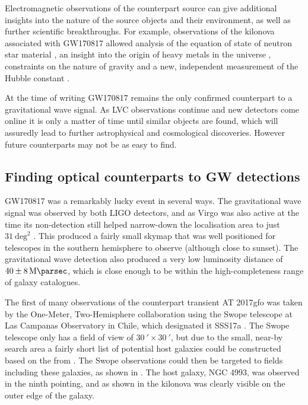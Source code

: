 \begin{colsection}
\begin{colsection}
Electromagnetic observations of the counterpart source can give additional insights into the nature of the source objects and their environment, as well as further scientific breakthroughs. For example, observations of the kilonova associated with GW170817 \citep{GW170817, GW170817_followup} allowed analysis of the equation of state of neutron star material \citep{GW170817_NSscience}, an insight into the origin of heavy metals in the universe \citep{GW170818_heavy}, constraints on the nature of gravity \citep{GW170817_gravity} and a new, independent measurement of the Hubble constant \citep{GW170817_hubble}.

\newpage

At the time of writing GW170817 remains the only confirmed counterpart to a gravitational wave signal. As LVC observations continue and new detectors come online it is only a matter of time until similar objects are found, which will assuredly lead to further astrophysical and cosmological discoveries. However future counterparts may not be as easy to find.

\end{colsection}


\subsection{Finding optical counterparts to GW detections}
\label{sec:followup}
\begin{colsection}

GW170817 was a remarkably lucky event in several ways. The gravitational wave signal was observed by both LIGO detectors, and as Virgo was also active at the time its non-detection still helped narrow-down the localisation area to just $31~\text{deg}^2$ \citep[see ]{GW170817}. This produced a fairly small skymap that was well positioned for telescopes in the southern hemisphere to observe (although close to sunset). The gravitational wave detection also produced a very low luminosity distance of $40\pm\SI{8}{\mega\parsec}$, which is close enough to be within the high-completeness range of galaxy catalogues.

The first of many observations of the counterpart transient AT 2017gfo was taken by the One-Meter, Two-Hemisphere collaboration using the Swope telescope at Las Campanas Observatory in Chile, which designated it SSS17a \citep{GW170817_Swope}. The Swope telescope only has a field of view of $\SI{30}{\arcmin}\times\SI{30}{\arcmin}$, but due to the small, near-by search area a fairly short list of potential host galaxies could be constructed based on the  from \citet{GWGC}. The Swope observations could then be targeted to fields including these galaxies, as shown in . The host galaxy, NGC 4993, was observed in the ninth pointing, and as shown in  the kilonova was clearly visible on the outer edge of the galaxy.


\end{colsection}
\end{colsection}
